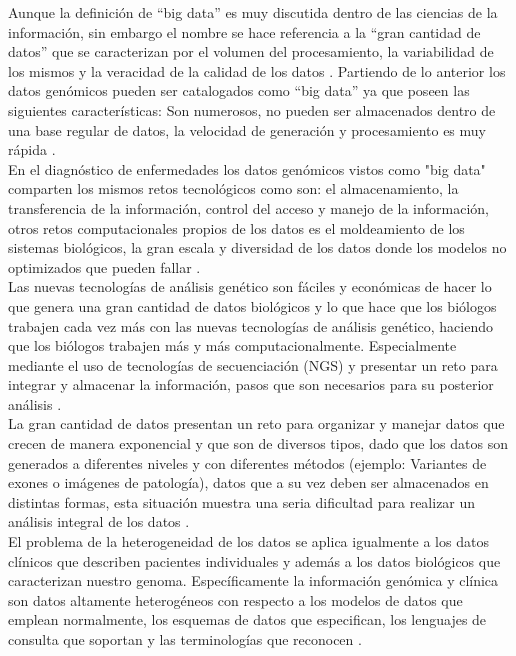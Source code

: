 Aunque la definición de “big data” es muy discutida dentro de las ciencias de la información, sin embargo el nombre se hace referencia a la “gran cantidad de datos” que se caracterizan por el volumen del procesamiento, la variabilidad de los mismos y la veracidad de la calidad de los datos \cite{Li2014}. Partiendo de lo anterior los datos genómicos  pueden ser catalogados como “big data” ya que poseen las siguientes características: Son numerosos, no pueden ser almacenados dentro de una base regular de datos, la velocidad  de generación y procesamiento es muy rápida \cite{Hashem2015}. \\

En el diagnóstico de enfermedades los datos genómicos vistos como "big data" comparten los mismos retos tecnológicos como son: el almacenamiento, la transferencia de la información, control del acceso y manejo de la información, otros retos computacionales propios de los datos es el moldeamiento de los sistemas biológicos, la gran escala y diversidad de los datos donde los modelos no optimizados que pueden fallar \cite{Ren2015}. \\

Las nuevas tecnologías de análisis genético son fáciles y económicas de hacer lo que genera una gran cantidad de datos biológicos y lo que hace que los biólogos trabajen cada vez más con las nuevas tecnologías de análisis genético, haciendo que los biólogos trabajen más y más computacionalmente. Especialmente mediante el uso de  tecnologías de secuenciación (NGS) y presentar un reto para integrar y almacenar la información, pasos que son necesarios para su posterior análisis \cite{Li2014,Cook2016}.\\

La gran cantidad de datos presentan un reto para organizar y manejar datos que crecen de manera exponencial y que son de diversos tipos, dado que los datos son generados a diferentes niveles y con diferentes métodos (ejemplo: Variantes de exones o imágenes de patología), datos que a su vez deben ser almacenados en distintas formas, esta situación muestra una seria dificultad para realizar un análisis integral de los datos \cite{Cook2016,Li2014}.\\

El problema de la heterogeneidad  de los datos  se aplica igualmente a los datos clínicos que describen pacientes individuales y además a los datos biológicos que caracterizan nuestro genoma. Específicamente la información genómica y clínica son datos altamente heterogéneos con respecto a los modelos de datos que emplean normalmente, los esquemas de datos que especifican, los lenguajes de consulta que soportan y las terminologías que reconocen \cite{Sujansky2001}.\\


